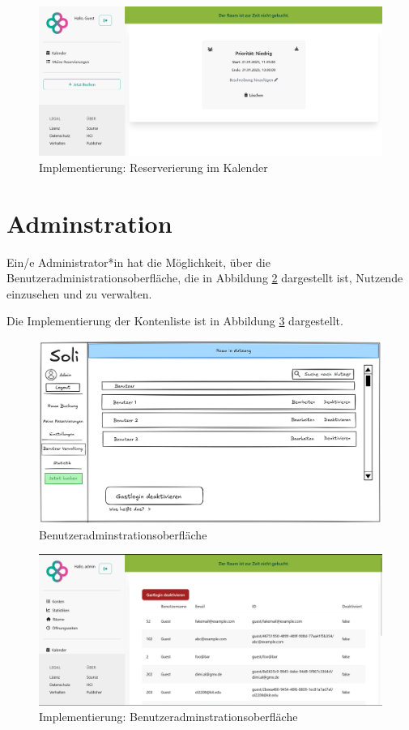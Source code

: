 \begin{figure}
    \centering
    \includegraphics[width=\textwidth]{figures/impl-views/bookings_single}
    \caption{Implementierung: Reserverierung im Kalender}
    \label{fig:impl-calendarviewbooking}
\end{figure}
\clearpage


\section{Adminstration}
Ein/e Administrator*in hat die Möglichkeit, über die Benutzeradministrationsoberfläche, die in Abbildung \ref{fig:adminuser} dargestellt ist, Nutzende einzusehen und zu verwalten.

Die Implementierung der Kontenliste ist in Abbildung \ref{fig:impl-adminuser} dargestellt.

\begin{figure}[ht]
    \centering
    \includegraphics[width=\textwidth]{figures/mockup/admin_users}
    \caption{Benutzeradminstrationsoberfläche}
    \label{fig:adminuser}
\end{figure}
\begin{figure}[ht]
    \centering
    \includegraphics[width=\textwidth]{figures/impl-views/admin_users}
    \caption{Implementierung: Benutzeradminstrationsoberfläche}
    \label{fig:impl-adminuser}
\end{figure}
\clearpage


